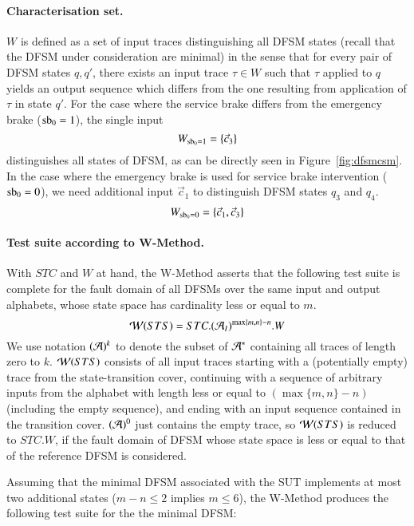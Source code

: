 \paragraph{Characterisation set.} $W$ is defined as a set of input traces distinguishing all DFSM states (recall that the DFSM under consideration are minimal) in the sense that for every pair
of DFSM states $q,q'$, there exists an input trace $\tau\in W$ such that $\tau$ applied to $q$
yields an output sequence which differs from the one resulting from application of $\tau$ in state
$q'$.
For the case where the service brake differs from the emergency brake ($\text{sb}_0 = 1$), the single input
$$
W_{\text{sb}_0=1}=\{\vec c_3\}  
$$
distinguishes all states of $\text{DFSM}$, as can be directly seen in Figure~\ref{fig:dfsmcsm}. In the case where the emergency brake is used for service brake intervention ($\text{sb}_0 = 0$), we need additional input $\vec c_1$ to distinguish DFSM states $q_3$ and $q_4$.
$$
W_{\text{sb}_0=0}=\{\vec c_1, \vec c_3\}  
$$

\paragraph{Test suite according to W-Method.} With $STC$ and $W$ at hand, the W-Method asserts that the following test suite is complete for the fault domain of all DFSMs over the same input and output alphabets, whose state space has cardinality less or equal to $m$.
$$
{\cal W}(STS) = STC.({\cal A}_I)^{\max\{m,n\}-n}.W
$$
We use notation $({\cal A})^k$ to denote the subset of ${\cal A}^*$ containing all traces of length zero to $k$. ${\cal W}(STS)$ consists of all input traces starting with a (potentially empty) trace from the state-transition cover, continuing with a sequence of arbitrary inputs from the alphabet with length less or equal to $(\max\{m,n\}-n)$ (including the empty sequence), and ending with an input sequence contained in the transition cover.
$({\cal A})^0$ just contains the empty trace, so ${\cal W}(STS)$ is reduced to 
$STC.W$, if the fault domain of DFSM whose state space is less or equal to that of the reference DFSM is considered.

 
Assuming that the minimal DFSM associated with the SUT implements at most two additional states ($m-n\le 2$ implies $m\le 6$), the W-Method produces the following test suite for the the minimal DFSM:

